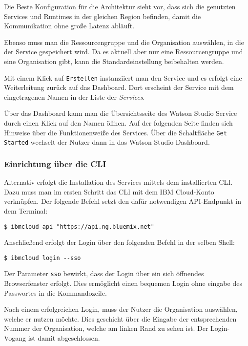 Die Beste Konfiguration für die Architektur sieht vor, dass sich die genutzten Services und Runtimes in der gleichen
Region befinden, damit die Kommunikation ohne große Latenz abläuft.

Ebenso muss man die Ressourcengruppe und die Organisation auswählen, in die der Service gespeichert wird. Da es aktuell
aber nur eine Ressourcengruppe und eine Organisation gibt, kann die Standardeinstellung beibehalten werden.

Mit einem Klick auf \texttt{Erstellen} instanziiert man den Service und es erfolgt eine Weiterleitung zurück auf das
Dashboard. Dort erscheint der Service mit dem eingetragenen Namen in der Liste der \textit{Services}.

Über das Dashboard kann man die Übersichtsseite des Watson Studio Service durch einen Klick auf den Namen öffnen. Auf
der folgenden Seite finden sich Hinweise über die Funktionenweiße des Services. Über die Schaltfläche
\texttt{Get Started} wechselt der Nutzer dann in das Watson Studio Dashboard.

\subsubsection{Einrichtung über die CLI}
Alternativ erfolgt die Installation des Services mittels dem installierten CLI. Dazu muss man im ersten Schritt das CLI
mit dem IBM Cloud-Konto verknüpfen. Der folgende Befehl setzt den dafür notwendigen API-Endpunkt in dem Terminal:

\begin{lstlisting}[caption=Setzen des API-Endpunktes, label=ls:vorbereitung_apiendpunkt]
    $ ibmcloud api "https://api.ng.bluemix.net"
\end{lstlisting}

Anschließend erfolgt der Login über den folgenden Befehl in der selben Shell:

\begin{lstlisting}[caption=Login über CLI und Single Sign-on, label=ls:vorbereitung_login]
    $ ibmcloud login --sso
\end{lstlisting}

Der Parameter \texttt{sso} bewirkt, dass der Login über ein sich öffnendes Browserfenster erfolgt. Dies ermöglicht einen
bequemen Login ohne eingabe des Passwortes in die Kommandozeile.

Nach einem erfolgreichen Login, muss der Nutzer die Organisation auswählen, welche er nutzen möchte. Dies geschieht über
die Eingabe der entsprechenden Nummer der Organisation, welche am linken Rand zu sehen ist. Der Login-Vogang ist damit
abgeschlossen.

